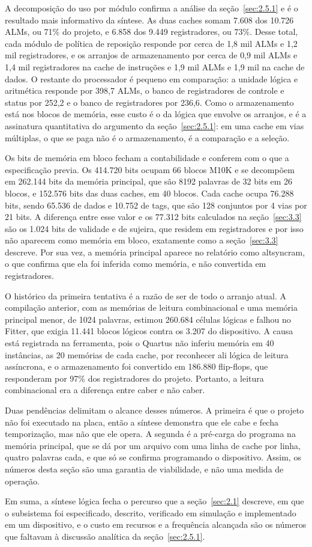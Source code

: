 A decomposição do uso por módulo confirma a análise da seção~\ref{sec:2.5.1} e é o resultado mais informativo da síntese. As duas caches somam 7.608 dos 10.726 ALMs, ou 71\% do projeto, e 6.858 dos 9.449 registradores, ou 73\%. Desse total, cada módulo de política de reposição responde por cerca de 1,8 mil ALMs e 1,2 mil registradores, e os arranjos de armazenamento por cerca de 0,9 mil ALMs e 1,4 mil registradores na cache de instruções e 1,9 mil ALMs e 1,9 mil na cache de dados. O restante do processador é pequeno em comparação: a unidade lógica e aritmética responde por 398,7 ALMs, o banco de registradores de controle e status por 252,2 e o banco de registradores por 236,6. Como o armazenamento está nos blocos de memória, esse custo é o da lógica que envolve os arranjos, e é a assinatura quantitativa do argumento da seção~\ref{sec:2.5.1}: em uma cache em vias múltiplas, o que se paga não é o armazenamento, é a comparação e a seleção.

Os bits de memória em bloco fecham a contabilidade e conferem com o que a especificação previa. Os 414.720 bits ocupam 66 blocos M10K e se decompõem em 262.144 bits da memória principal, que são 8192 palavras de 32 bits em 26 blocos, e 152.576 bits das duas caches, em 40 blocos. Cada cache ocupa 76.288 bits, sendo 65.536 de dados e 10.752 de tags, que são 128 conjuntos por 4 vias por 21 bits. A diferença entre esse valor e os 77.312 bits calculados na seção~\ref{sec:3.3} são os 1.024 bits de validade e de sujeira, que residem em registradores e por isso não aparecem como memória em bloco, exatamente como a seção~\ref{sec:3.3} descreve. Por sua vez, a memória principal aparece no relatório como altsyncram, o que confirma que ela foi inferida como memória, e não convertida em registradores.

O histórico da primeira tentativa é a razão de ser de todo o arranjo atual. A compilação anterior, com as memórias de leitura combinacional e uma memória principal menor, de 1024 palavras, estimou 260.684 células lógicas e falhou no Fitter, que exigia 11.441 blocos lógicos contra os 3.207 do dispositivo. A causa está registrada na ferramenta, pois o Quartus não inferiu memória em 40 instâncias, as 20 memórias de cada cache, por reconhecer ali lógica de leitura assíncrona, e o armazenamento foi convertido em 186.880 flip-flops, que responderam por 97\% dos registradores do projeto. Portanto, a leitura combinacional era a diferença entre caber e não caber.

Duas pendências delimitam o alcance desses números. A primeira é que o projeto não foi executado na placa, então a síntese demonstra que ele cabe e fecha temporização, mas não que ele opera. A segunda é a pré-carga do programa na memória principal, que se dá por um arquivo com uma linha de cache por linha, quatro palavras cada, e que só se confirma programando o dispositivo. Assim, os números desta seção são uma garantia de viabilidade, e não uma medida de operação.

Em suma, a síntese lógica fecha o percurso que a seção~\ref{sec:2.1} descreve, em que o subsistema foi especificado, descrito, verificado em simulação e implementado em um dispositivo, e o custo em recursos e a frequência alcançada são os números que faltavam à discussão analítica da seção~\ref{sec:2.5.1}.
